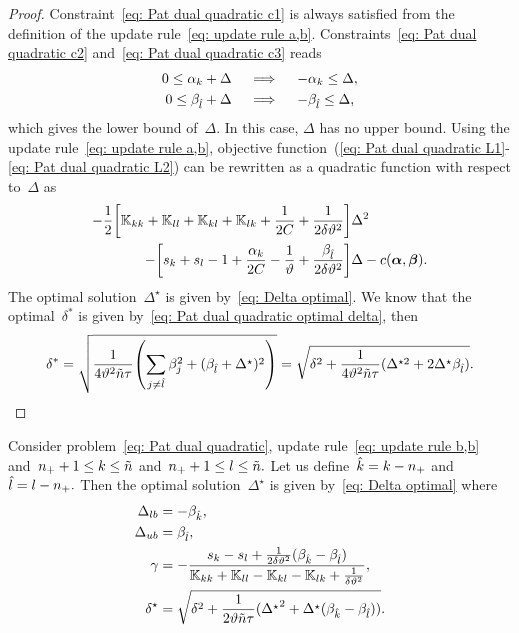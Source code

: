 \begin{proof}
  Constraint~\eqref{eq: Pat dual quadratic c1} is always satisfied from the definition of the update rule~\eqref{eq: update rule a,b}. Constraints~\eqref{eq: Pat dual quadratic c2} and~\eqref{eq: Pat dual quadratic c3} reads
  \begin{align*}
    0 \leq \alpha_k + \Delta
    & \quad \implies \quad
    - \alpha_k \leq \Delta, \\
    0 \leq \beta_{\hat{l}} + \Delta
    & \quad \implies \quad
    - \beta_{\hat{l}} \leq \Delta, \\
  \end{align*}
  which gives the lower bound of~$\Delta.$ In this case, $\Delta$ has no upper bound. Using the update rule~\eqref{eq: update rule a,b}, objective function~(\ref{eq: Pat dual quadratic L1}-\ref{eq: Pat dual quadratic L2}) can be rewritten as a quadratic function with respect to~$\Delta$ as
  \begin{align*}
    - \frac{1}{2} \Brac[s]{\K_{kk} + \K_{ll} + \K_{kl} + \K_{lk} + \frac{1}{2C} + \frac{1}{2 \delta \vartheta^2}} & \Delta^2 \\
    - \Brac[s]{s_k + s_l - 1 + \frac{\alphak}{2C} - \frac{1}{\vartheta} + \frac{\betal}{2\delta\vartheta^2}} & \Delta
    - c(\bm{\alpha}, \bm{\beta}).
  \end{align*}
  The optimal solution~$\Delta^{\star}$ is given by~\eqref{eq: Delta optimal}. We know that the optimal~$\delta^*$ is given by~\eqref{eq: Pat dual quadratic optimal delta}, then
  \begin{equation*}
    \delta^*
      = \sqrt{\frac{1}{4\vartheta^2 \ntil \tau} \Brac{\sum_{j\neq \hat{l}} \beta_j^2 + (\betal + \Delta^\star)^2}}
      = \sqrt{\delta^2 + \frac{1}{4\vartheta^2 \ntil \tau} (\Delta^{\star2} + 2\Delta^\star \betal)}.
  \end{equation*}
\end{proof}

\begin{lemma}
  Consider problem~\eqref{eq: Pat dual quadratic}, update rule~\eqref{eq: update rule b,b} and~$n_{+} + 1 \leq k \leq \tilde{n}$ and~$n_{+} + 1 \leq l \leq \tilde{n}.$ Let us define~$\hat{k} = k - n_{+}$ and~$\hat{l} = l - n_{+}.$ Then the optimal solution~$\Delta^{\star}$ is given by~\eqref{eq: Delta optimal} where
  \begin{align*}
    \Delta_{lb} & = - \beta_{\hat{k}}, \\
    \Delta_{ub} & = \beta_{\hat{l}}, \\
    \gamma      & = -\frac{s_k - s_l + \frac{1}{2\delta \vartheta^2}(\beta_{\hat{k}} - \beta_{\hat{l}})}{\mathbb{K}_{kk} + \mathbb{K}_{ll} - \mathbb{K}_{kl} - \mathbb{K}_{lk} + \frac{1}{\delta \vartheta^2}}, \\
    \delta^{\star}  & = \sqrt{\delta^2 + \frac{1}{2 \vartheta \tilde{n} \tau}({\Delta^{\star}}^2 + \Delta^{\star} (\beta_{\hat{k}} - \beta_{\hat{l}}))}.
  \end{align*}
\end{lemma}

